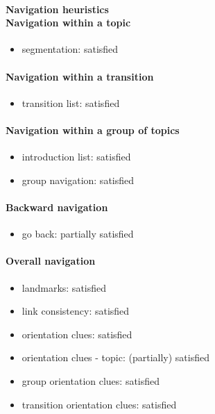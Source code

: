 \begin{enumerate}
	\paragraph*{Navigation heuristics \\ Navigation within a topic}
	\begin{itemize}
		\item segmentation: satisfied
	\end{itemize}	

	\paragraph*{Navigation within a transition}
	\begin{itemize}
		\item transition list: satisfied
	\end{itemize}

	\paragraph*{Navigation within a group of topics}
	\begin{itemize}
		\item introduction list: satisfied
		\item group navigation: satisfied
	\end{itemize}

	\paragraph*{Backward navigation}
	\begin{itemize}
		\item go back: partially satisfied
	\end{itemize}

	\paragraph*{Overall navigation}
	\begin{itemize}
		\item landmarks: satisfied
		\item link consistency: satisfied
		\item orientation clues: satisfied
		\item orientation clues - topic: (partially) satisfied
		\item group orientation clues: satisfied
		\item transition orientation clues: satisfied
	\end{itemize}	


\end{enumerate}
